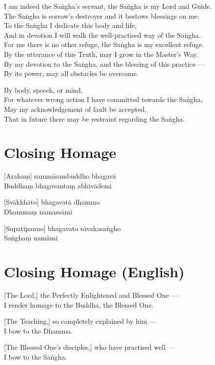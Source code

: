 I am indeed the Saṅgha's servant, the Saṅgha is my Lord and Guide.\\
The Saṅgha is sorrow's destroyer and it bestows blessings on me.\\
To the Saṅgha I dedicate this body and life,\\
And in devotion I will walk the well-practised way of the Saṅgha.\\
For me there is no other refuge, the Saṅgha is my excellent refuge.\\
By the utterance of this Truth, may I grow in the Master's Way.\\
By my devotion to the Saṅgha, and the blessing of this practice ---\\
By its power, may all obstacles be overcome.


By body, speech, or mind,\\
For whatever wrong action I have committed towards the Saṅgha,\\
May my acknowledgement of fault be accepted,\\
That in future there may be restraint regarding the Saṅgha.

\section*{Closing Homage}

[Arahaṃ] sammāsambuddho bhagavā\\
Buddhaṃ bhagavantaṃ abhivādemi

[Svākkhāto] bhagavatā dhammo\\
Dhammaṃ namassāmi

[Supaṭipanno] bhagavato sāvakasaṅgho\\
Saṅghaṃ namāmi

\section*{Closing Homage (English)}

[The Lord,] the Perfectly Enlightened and Blessed One ---\\
I render homage to the Buddha, the Blessed One.

[The Teaching,] so completely explained by him ---\\
I bow to the Dhamma.

[The Blessed One's disciples,] who have practised well ---\\
I bow to the Saṅgha.

